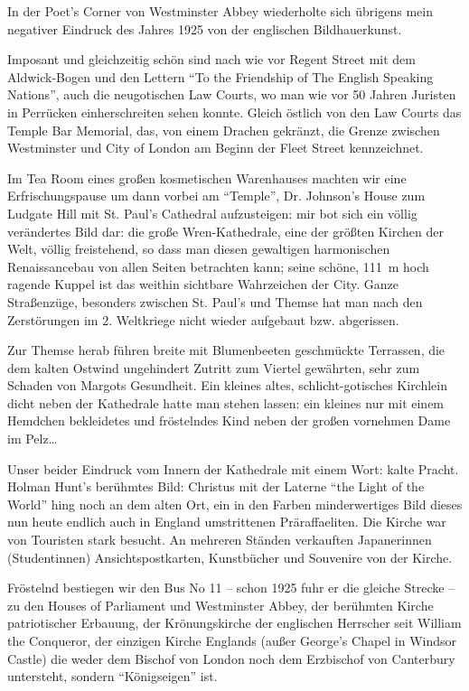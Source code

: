 In der Poet's Corner von Westminster Abbey wiederholte sich übrigens mein negativer Eindruck des Jahres 1925 von der englischen Bildhauerkunst.

Imposant und gleichzeitig schön sind nach wie vor Regent Street mit dem Aldwick-Bogen und den Lettern \enquote{To the Friendship of The English Speaking Nations}, auch die neugotischen Law Courts, wo man wie vor 50 Jahren Juristen in Perrücken einherschreiten sehen konnte. Gleich östlich von den Law Courts das Temple Bar Memorial, das, von einem Drachen gekränzt, die Grenze zwischen Westminster und City of London am Beginn der Fleet Street kennzeichnet.

Im Tea Room eines großen kosmetischen Warenhauses machten wir eine Erfrischungspause um dann vorbei am \enquote{Temple}, Dr. Johnson's House zum Ludgate Hill mit St. Paul's Cathedral aufzusteigen: mir bot sich ein völlig verändertes Bild dar: die große Wren-Kathedrale, eine der größten Kirchen der Welt, völlig freistehend, so dass man diesen gewaltigen harmonischen Renaissancebau von allen Seiten betrachten kann; seine schöne, 111~m hoch ragende Kuppel ist das weithin sichtbare Wahrzeichen der City. Ganze Straßenzüge, besonders zwischen St. Paul's und Themse hat man nach den Zerstörungen im 2. Weltkriege nicht wieder aufgebaut bzw. abgerissen.

Zur Themse herab führen breite mit Blumenbeeten geschmückte Terrassen, die dem kalten Ostwind ungehindert Zutritt zum Viertel gewährten, sehr zum Schaden von Margots Gesundheit. Ein kleines altes, schlicht-gotisches Kirchlein dicht neben der Kathedrale hatte man stehen lassen: ein kleines nur mit einem Hemdchen bekleidetes und fröstelndes Kind neben der großen vornehmen Dame im Pelz\dots

Unser beider Eindruck vom Innern der Kathedrale mit einem Wort: kalte Pracht. Holman Hunt's berühmtes Bild: Christus mit der Laterne \enquote{the Light of the World} hing noch an dem alten Ort, ein in den Farben minderwertiges Bild dieses nun heute endlich auch in England umstrittenen Präraffaeliten. Die Kirche war von Touristen stark besucht. An mehreren Ständen verkauften Japanerinnen (Studentinnen) Ansichtspostkarten, Kunstbücher und Souvenire von der Kirche.

Fröstelnd bestiegen wir den Bus No 11 -- schon 1925 fuhr er die gleiche Strecke -- zu den Houses of Parliament und Westminster Abbey, der berühmten Kirche patriotischer Erbauung, der Krönungskirche der englischen Herrscher seit William the Conqueror, der einzigen Kirche Englands (außer George's Chapel in Windsor Castle) die weder dem Bischof von London noch dem Erzbischof von Canterbury untersteht, sondern \enquote{Königseigen} ist.

